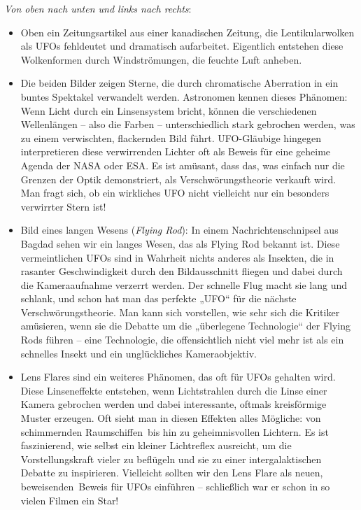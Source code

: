\documentclass{scrartcl}
\begin{document}
\textit{Von oben nach unten und links nach rechts}:

\begin{itemize}
	\item Oben ein Zeitungsartikel aus einer kanadischen Zeitung, die Lentikularwolken als UFOs fehldeutet und dramatisch aufarbeitet. Eigentlich entstehen diese Wolkenformen durch Windströmungen, die feuchte Luft anheben. 
	\item Die beiden Bilder zeigen Sterne, die durch chromatische Aberration in ein buntes Spektakel verwandelt werden. Astronomen kennen dieses Phänomen: Wenn Licht durch ein Linsensystem bricht, können die verschiedenen Wellenlängen – also die Farben – unterschiedlich stark gebrochen werden, was zu einem verwischten, flackernden Bild führt. UFO-Gläubige hingegen interpretieren diese verwirrenden Lichter oft als Beweis für eine geheime Agenda der NASA oder ESA. Es ist amüsant, dass das, was einfach nur die Grenzen der Optik demonstriert, als Verschwörungstheorie verkauft wird. Man fragt sich, ob ein wirkliches UFO nicht vielleicht nur ein besonders verwirrter Stern ist!  
	\item Bild eines langen Wesens (\textit{Flying Rod}): In einem Nachrichtenschnipsel aus Bagdad sehen wir ein langes Wesen, das als Flying Rod bekannt ist. Diese vermeintlichen UFOs sind in Wahrheit nichts anderes als Insekten, die in rasanter Geschwindigkeit durch den Bildausschnitt fliegen und dabei durch die Kameraaufnahme verzerrt werden. Der schnelle Flug macht sie lang und schlank, und schon hat man das perfekte „UFO“ für die nächste Verschwörungstheorie. Man kann sich vorstellen, wie sehr sich die Kritiker amüsieren, wenn sie die Debatte um die „überlegene Technologie“ der Flying Rods führen – eine Technologie, die offensichtlich nicht viel mehr ist als ein schnelles Insekt und ein unglückliches Kameraobjektiv.  
	\item Lens Flares sind ein weiteres Phänomen, das oft für UFOs gehalten wird. Diese Linseneffekte entstehen, wenn Lichtstrahlen durch die Linse einer Kamera gebrochen werden und dabei interessante, oftmals kreisförmige Muster erzeugen. Oft sieht man in diesen Effekten alles Mögliche: von schimmernden \frq Raumschiffen\flq\ bis hin zu geheimnisvollen \flq Lichtern\frq. Es ist faszinierend, wie selbst ein kleiner Lichtreflex ausreicht, um die Vorstellungskraft vieler zu beflügeln und sie zu einer intergalaktischen Debatte zu inspirieren. Vielleicht sollten wir den Lens Flare als neuen, \frq beweisenden\flq\ Beweis für UFOs einführen – schließlich war er schon in so vielen Filmen ein Star! 

\end{itemize}
\end{document}
